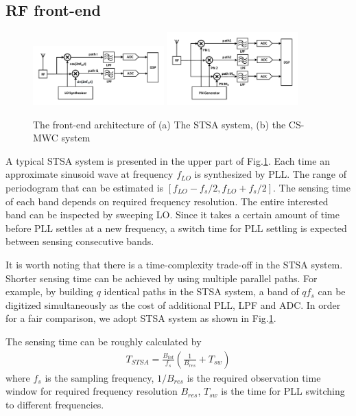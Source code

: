 \documentclass{IEEEtran}
\begin{document}
\subsection{RF front-end}
\begin{figure}
\begin{center}
\includegraphics[width=0.45\textwidth]{figure/STPE_system}
\includegraphics[width=0.45\textwidth]{figure/CS_system}
\end{center}
\vspace{-6mm}
\caption{The front-end architecture of (a) The STSA system, (b) the CS-MWC system}
\label{fig:other_systems}
\vspace{-4mm}
\end{figure}

A typical STSA system is presented in the upper part of Fig.\ref{fig:other_systems}. Each time an approximate sinusoid wave at frequency $f_{LO}$ is synthesized by PLL. The range of periodogram that can be estimated is $[f_{LO}-f_s/2,f_{LO}+f_s/2]$. The sensing time of each band depends on required frequency resolution. The entire interested band can be inspected by sweeping LO. Since it takes a certain amount of time before PLL settles at a new frequency, a switch time for PLL settling is expected between sensing consecutive bands.

It is worth noting that there is a time-complexity trade-off in the STSA system. Shorter sensing time can be achieved by using multiple parallel paths. For example, by building $q$ identical paths in the STSA system, a band of $q f_s$ can be digitized simultaneously as the cost of additional PLL, LPF and ADC. In order for a fair comparison, we adopt STSA system as shown in Fig.\ref{fig:other_systems}.

The sensing time can be roughly calculated by
\begin{align}
T_{STSA} = \frac{B_{tot}}{f_s}(\frac{1}{B_{res}}+T_{sw})
\end{align}
where $f_s$ is the sampling frequency, $1/B_{res}$ is the required observation time window for required frequency resolution $B_{res}$, $T_{sw}$ is the time for PLL switching to different frequencies.
\end{document}
